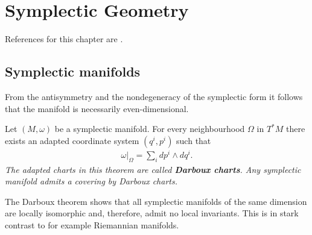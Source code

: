 \chapter{Symplectic Geometry}\label{chapter:symplectic}

    References for this chapter are \cite{mcduff, symplectic}.

\section{Symplectic manifolds}


    \begin{property}[Dimension]
        From the antisymmetry and the nondegeneracy of the symplectic form it follows that the manifold is necessarily even-dimensional.
    \end{property}

    \begin{theorem}[Darboux]
        Let $(M,\omega)$ be a symplectic manifold. For every neighbourhood $\Omega$ in $T^*M$ there exists an adapted coordinate system $(q^i,p^i)$ such that
        \begin{gather}
            \left.\omega\right|_\Omega = \sum_idp^i\wedge dq^i.
        \end{gather}
        \emph{The adapted charts in this theorem are called \textbf{Darboux charts}. Any symplectic manifold admits a covering by Darboux charts.}
    \end{theorem}
    \begin{remark}
        The Darboux theorem shows that all symplectic manifolds of the same dimension are locally isomorphic and, therefore, admit no local invariants. This is in stark contrast to for example Riemannian manifolds.
    \end{remark}

